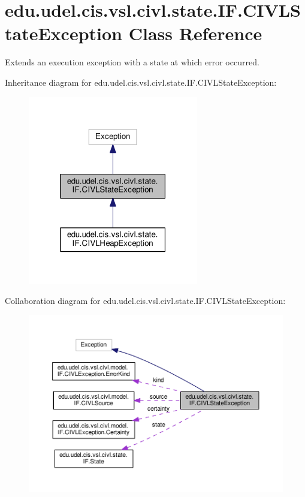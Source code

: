 \hypertarget{classedu_1_1udel_1_1cis_1_1vsl_1_1civl_1_1state_1_1IF_1_1CIVLStateException}{}\section{edu.\+udel.\+cis.\+vsl.\+civl.\+state.\+I\+F.\+C\+I\+V\+L\+State\+Exception Class Reference}
\label{classedu_1_1udel_1_1cis_1_1vsl_1_1civl_1_1state_1_1IF_1_1CIVLStateException}


Extends an execution exception with a state at which error occurred.  




Inheritance diagram for edu.\+udel.\+cis.\+vsl.\+civl.\+state.\+I\+F.\+C\+I\+V\+L\+State\+Exception\+:
\nopagebreak
\begin{figure}[H]
\begin{center}
\leavevmode
\includegraphics[width=211pt]{classedu_1_1udel_1_1cis_1_1vsl_1_1civl_1_1state_1_1IF_1_1CIVLStateException__inherit__graph}
\end{center}
\end{figure}


Collaboration diagram for edu.\+udel.\+cis.\+vsl.\+civl.\+state.\+I\+F.\+C\+I\+V\+L\+State\+Exception\+:
\nopagebreak
\begin{figure}[H]
\begin{center}
\leavevmode
\includegraphics[width=350pt]{classedu_1_1udel_1_1cis_1_1vsl_1_1civl_1_1state_1_1IF_1_1CIVLStateException__coll__graph}
\end{center}
\end{figure}
